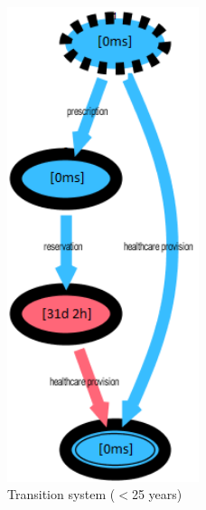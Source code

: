 \begin{figure} [htbp]
\begin{minipage}[t]{0.5\textwidth}
\includegraphics[width=0.5\textwidth]{AmbulatorioSojournYoungs}
\caption{Transition system ($<$25 years)}
\end{minipage}
\begin{minipage}[t]{0.5\textwidth}

\end{minipage}
\end{figure}
